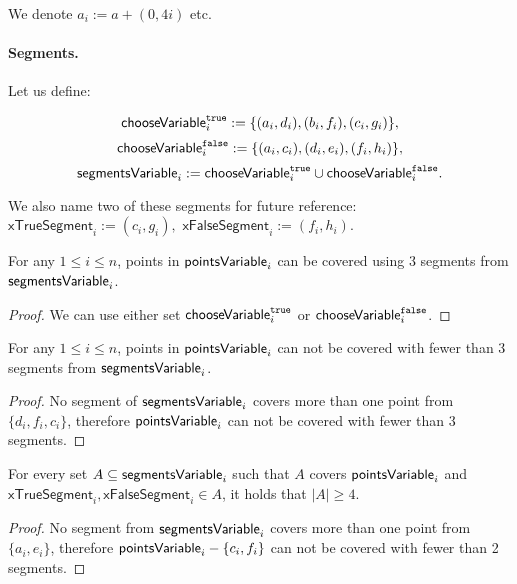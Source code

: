 We denote $a_i := a + (0,4i)$ etc.

\paragraph{Segments.}

\newcommand{\xTrueSegmentDef}[1]{(c_{#1}, g_{#1})}
\newcommand{\xFalseSegmentDef}[1]{(f_{#1}, h_{#1})}
\newcommand{\xTrueSegment}[1]{\mathsf{xTrueSegment}_{#1}}
\newcommand{\xFalseSegment}[1]{\mathsf{xFalseSegment}_{#1}}
\newcommand{\orTrueSegment}[2]{(t_{#1, #2}, v_{#1, #2})}

Let us define:

$$\mathsf{chooseVariable}^{\texttt{true}}_{i} :=\{ (a_i, d_i), (b_i, f_i), (c_i, g_i)\},$$
$$\mathsf{chooseVariable}^{\texttt{false}}_{i} := \{(a_i, c_i), (d_i, e_i), (f_i, h_i)\},$$
$$\mathsf{segmentsVariable}_{i} := \mathsf{chooseVariable}^{\texttt{true}}_{i} \cup \mathsf{chooseVariable}^{\texttt{false}}_{i}.$$

We also name two of these segments for future reference:
$\xTrueSegment{i} := \xTrueSegmentDef{i},$
$\xFalseSegment{i} := \xFalseSegmentDef{i}.$

\begin{lemma}
\label{choose_variables_solution}
For any $1 \le i \le n$, points in $\mathsf{pointsVariable}_{i}$
can be covered using 3 segments from $\mathsf{segmentsVariable}_{i}$.
\end{lemma}

\begin{proof}
We can use either set $\mathsf{chooseVariable}^{\texttt{true}}_{i}$ or $\mathsf{chooseVariable}^{\texttt{false}}_{i}$.
\end{proof}

\begin{lemma}
\label{choose_variables_no_less}
For any $1 \le i \le n$, points in $\mathsf{pointsVariable}_{i}$
can not be covered with fewer than 3 segments from $\mathsf{segmentsVariable}_{i}$.
\end{lemma}

\begin{proof}
No segment of $\mathsf{segmentsVariable}_{i}$ covers more than one point from
$\{d_i, f_i, c_i\}$, therefore $\mathsf{pointsVariable}_{i}$ can
not be covered with fewer than 3 segments.
\end{proof}

\begin{lemma}
\label{choose_variables_both}
For every set $A \subseteq \mathsf{segmentsVariable}_{i}$ such that $A$ covers $\mathsf{pointsVariable}_{i}$
and $\xTrueSegment{i}, \xFalseSegment{i} \in A$,
it holds that $|A| \ge 4$.
\end{lemma}
\begin{proof}
No segment from $\mathsf{segmentsVariable}_{i}$ covers more than one point from
$\{a_i, e_i\}$,
therefore 
$\mathsf{pointsVariable}_{i} - \{c_i, f_i\}$
can not be covered with fewer than 2 segments.
\end{proof}


